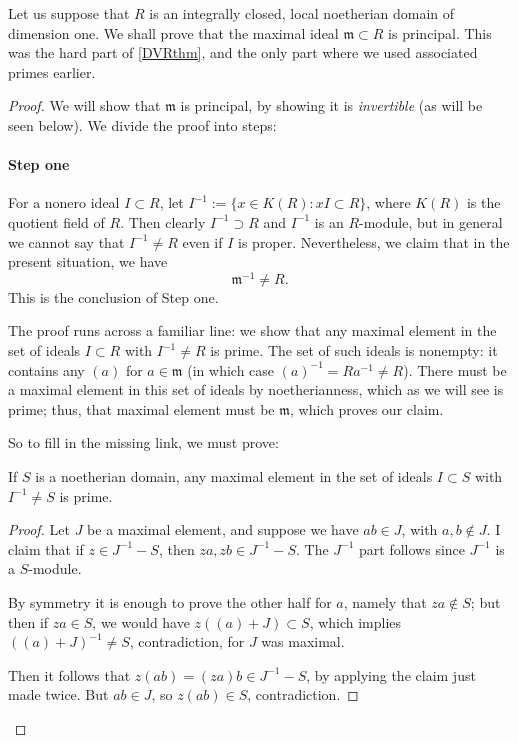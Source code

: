 Let us suppose that $R$ is an integrally closed, local noetherian domain of
dimension one. We shall prove that the maximal ideal $\mathfrak{m} \subset R$
is principal. This was the hard part of \cref{DVRthm}, and the only part
where we used associated primes earlier.
\begin{proof}
We will show that $\mathfrak{m}$ is principal, by showing it is \emph{invertible} (as will be seen below).   We divide the proof into steps:

\paragraph{Step one}
For a nonero ideal $I \subset R$, let $I^{-1} := \{ x \in K(R): xI \subset R \}$,
where $K(R)$ is the quotient field of $R$.  Then clearly $I^{-1} \supset R$
and $I^{-1}$ is an $R$-module, but in general we cannot say that $I^{-1} \neq
R$ even if $I$ is proper.  
Nevertheless, we claim that in the present situation, we have  \[
{\mathfrak{m}^{-1} \neq R.}\] This is the conclusion of Step one.

The proof runs across a familiar line: we show that any maximal element in the
set of ideals $I \subset R$ with $I^{-1} \neq R$ is prime. 
The set of such ideals is nonempty: it contains   any $(a)$ for $a \in \mathfrak{m}$ (in which case $(a)^{-1} = Ra^{-1} \neq R$).  
There must be a maximal element in this set of ideals by noetherianness, which
as we will see is prime; thus,  that maximal element must be $\mathfrak{m}$, which proves our claim.

So to fill in the missing link, we must prove:
\begin{lemma} If $S$ is a noetherian domain, any maximal element in the set of ideals $I \subset S$ with $I^{-1} \neq S$ is prime.
\end{lemma}

\begin{proof}
Let $J$ be a maximal element, and suppose we have $ab \in J$, with  $a,b \notin J$.  I claim that if $z \in J^{-1} - S$, then $za, zb \in J^{-1} - S$.  The $J^{-1}$ part follows since $J^{-1}$ is a $S$-module.

By symmetry it is enough to prove the other half for $a$, namely that $za \notin
S$; but then if $za \in S$, we would have $z( (a) + J ) \subset S$, which implies $ ( (a) + J)^{-1} \neq S$, contradiction, for $J$ was maximal.

Then it follows that $z(ab) = (za) b \in J^{-1} - S$, by applying the claim  just made twice.  But $ab \in J$, so $z(ab) \in S$, contradiction.
\end{proof}




\end{proof}
